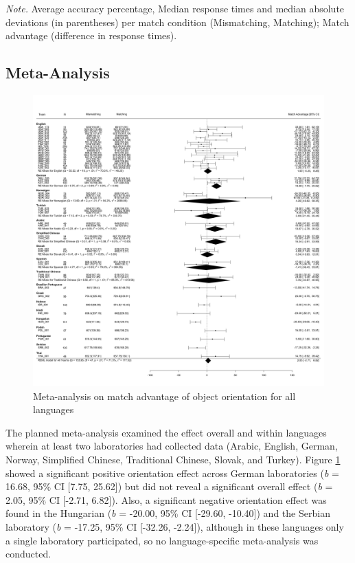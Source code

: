 \documentclass[
  man,floatsintext]{apa7}
\begin{document}
\begin{table}[tbp]
\begin{center}
\begin{threeparttable}
\begin{tablenotes}[para]
\normalsize{\textit{Note.} Average accuracy percentage, Median response times and median absolute deviations (in parentheses) per match condition (Mismatching, Matching); Match advantage (difference in response times).}
\end{tablenotes}

\end{threeparttable}
\end{center}

\end{table}

\hypertarget{meta-analysis}{%
\subsection{Meta-Analysis}\label{meta-analysis}}

\begin{figure}
\centering
\includegraphics{includes/fig/meta-all.png}
\caption{\label{fig:meta-all-plot}Meta-analysis on match advantage of object orientation for all languages}
\end{figure}

The planned meta-analysis examined the effect overall and within languages wherein at least two laboratories had collected data (Arabic, English, German, Norway, Simplified Chinese, Traditional Chinese, Slovak, and Turkey). Figure \ref{fig:meta-all-plot} showed a significant positive orientation effect across German laboratories (\emph{b} = 16.68, 95\% CI {[}7.75, 25.62{]}) but did not reveal a significant overall effect (\emph{b} = 2.05, 95\% CI {[}-2.71, 6.82{]}). Also, a significant negative orientation effect was found in the Hungarian (\emph{b} = -20.00, 95\% CI {[}-29.60, -10.40{]}) and the Serbian laboratory (\emph{b} = -17.25, 95\% CI {[}-32.26, -2.24{]}), although in these languages only a single laboratory participated, so no language-specific meta-analysis was conducted.
\end{document}
